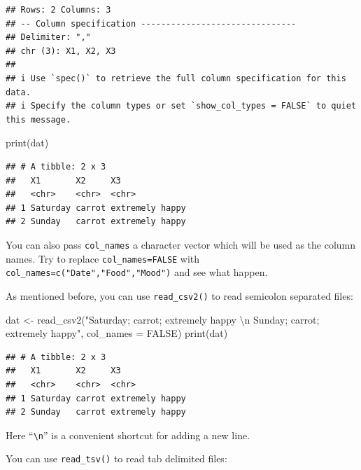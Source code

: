 \documentclass[
  12pt,
]{krantz}
\makeatletter
\newenvironment{Shaded}{\begin{snugshade}}{\end{snugshade}}
\newcommand{\AttributeTok}[1]{\textcolor[rgb]{0.61,0.61,0.61}{#1}}
\newcommand{\ConstantTok}[1]{\textcolor[rgb]{0,0,0}{#1}}
\newcommand{\FunctionTok}[1]{\textcolor[rgb]{0,0,0}{#1}}
\newcommand{\NormalTok}[1]{#1}
\newcommand{\OtherTok}[1]{\textcolor[rgb]{0.37,0.37,0.37}{#1}}
\newcommand{\SpecialCharTok}[1]{\textcolor[rgb]{0,0,0}{#1}}
\newcommand{\StringTok}[1]{\textcolor[rgb]{0.5,0.5,0.5}{#1}}
\newenvironment{kframe}{%
\medskip{}
\setlength{\fboxsep}{.8em}
 \def\at@end@of@kframe{}%
 \ifinner\ifhmode%
  \def\at@end@of@kframe{\end{minipage}}%
  \begin{minipage}{\columnwidth}%
 \fi\fi%
 \def\FrameCommand##1{\hskip\@totalleftmargin \hskip-\fboxsep
 \colorbox{shadecolor}{##1}\hskip-\fboxsep
     \hskip-\linewidth \hskip-\@totalleftmargin \hskip\columnwidth}%
 \MakeFramed {\advance\hsize-\width
   \@totalleftmargin\z@ \linewidth\hsize
   \@setminipage}}%
 {\par\unskip\endMakeFramed%
 \at@end@of@kframe}
\renewenvironment{Shaded}{\begin{kframe}}{\end{kframe}}
\makeatother
\begin{document}
\begin{verbatim}
## Rows: 2 Columns: 3
## -- Column specification -------------------------------
## Delimiter: ","
## chr (3): X1, X2, X3
## 
## i Use `spec()` to retrieve the full column specification for this data.
## i Specify the column types or set `show_col_types = FALSE` to quiet this message.
\end{verbatim}

\begin{Shaded}
\begin{Highlighting}[]
\FunctionTok{print}\NormalTok{(dat)}
\end{Highlighting}
\end{Shaded}

\begin{verbatim}
## # A tibble: 2 x 3
##   X1       X2     X3             
##   <chr>    <chr>  <chr>          
## 1 Saturday carrot extremely happy
## 2 Sunday   carrot extremely happy
\end{verbatim}

You can also pass \texttt{col\_names} a character vector which will be used as the column names. Try to replace \texttt{col\_names=FALSE} with \texttt{col\_names=c("Date","Food","Mood")} and see what happen.

As mentioned before, you can use \texttt{read\_csv2()} to read semicolon separated files:

\begin{Shaded}
\begin{Highlighting}[]
\NormalTok{dat }\OtherTok{\textless{}{-}} \FunctionTok{read\_csv2}\NormalTok{(}\StringTok{"Saturday; carrot; extremely happy }\SpecialCharTok{\textbackslash{}n}\StringTok{ }
\StringTok{                 Sunday; carrot; extremely happy"}\NormalTok{, }\AttributeTok{col\_names =} \ConstantTok{FALSE}\NormalTok{)}
\FunctionTok{print}\NormalTok{(dat)}
\end{Highlighting}
\end{Shaded}

\begin{verbatim}
## # A tibble: 2 x 3
##   X1       X2     X3             
##   <chr>    <chr>  <chr>          
## 1 Saturday carrot extremely happy
## 2 Sunday   carrot extremely happy
\end{verbatim}

Here ``\texttt{\textbackslash{}n}'' is a convenient shortcut for adding a new line.

You can use \texttt{read\_tsv()} to read tab delimited files:
\end{document}
